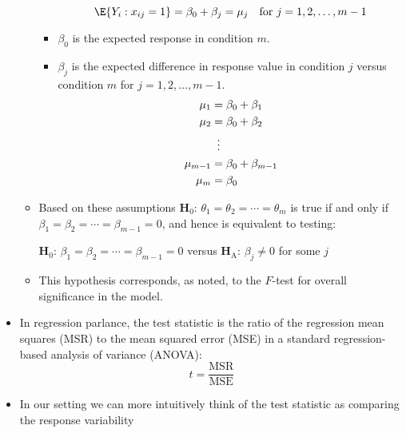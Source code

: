 \begin{itemize}
\begin{itemize}
\begin{itemize}
                              \[ \E{Y_i\given x_{ij}=1}=\beta_0+\beta_j=\mu_j\quad\text{for }j=1,2,\ldots,m-1 \]
                    \end{itemize}
                    \begin{itemize}
                        \item $ \beta_0 $ is the expected response in condition $ m $.
                        \item $ \beta_j $ is the expected difference in response value in condition $ j $
                              versus condition $ m $ for $ j=1,2,\ldots,m-1 $.
                              \begin{align*}
                                  \mu_1     & =\beta_0+\beta_1      \\
                                  \mu_2     & =\beta_0+\beta_2      \\
                                            & \vdotswithin{=}       \\
                                  \mu_{m-1} & = \beta_0+\beta_{m-1} \\
                                  \mu_m     & =\beta_0
                              \end{align*}
                    \end{itemize}
              \item Based on these assumptions $ \mathbf{H}_0 $: $ \theta_1=\theta_2=\cdots=\theta_m $
                    is true if and only if $ \beta_1=\beta_2=\cdots=\beta_{m-1}=0 $, and hence is equivalent
                    to testing:
                    \begin{tightcenter}
                        $ \mathbf{H}_0 $: $ \beta_1=\beta_2=\cdots=\beta_{m-1}=0 $ versus $ \mathbf{H}_\text{A} $: $ \beta_j\ne 0 $ for some $ j$
                    \end{tightcenter}
              \item This hypothesis corresponds, as noted, to the $ F $-test for overall significance in the model.
          \end{itemize}
    \item In regression parlance, the test statistic is the ratio of the
          regression mean squares (MSR)
          to the mean squared error (MSE) in a standard regression-based analysis of variance (ANOVA):
          \[ t=\frac{\text{MSR}}{\text{MSE}} \]
    \item In our setting we can more intuitively think of the test
          statistic as comparing the response variability

\end{itemize}
